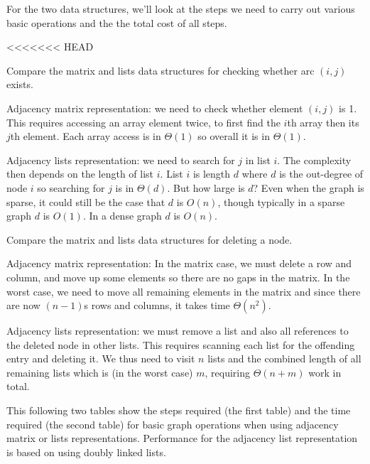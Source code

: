 For the two data structures, we'll look at the steps we need to carry out various basic operations and the the total cost of all steps. 

<<<<<<< HEAD
\begin{Boxample}[0]
Compare the matrix and lists data structures for checking whether arc $(i,j)$ exists.
 
Adjacency matrix representation: we need to check whether element $(i,j)$ is 1. This requires accessing
an array element twice, to first find the $i$th array then its $j$th element. Each array access is in $\Theta(1)$ so overall it is in $\Theta(1)$.

Adjacency lists representation: we need to search for $j$ in list $i$. The complexity then depends on the length of list $i$. 
List $i$ is length $d$ where $d$ is the out-degree of node $i$ so searching for $j$ is in $\Theta(d)$. 
But how large is $d$? Even when the graph is sparse, it could still be the case that $d$ is $O(n)$, though typically in a sparse graph $d$ is $O(1)$.  
In a dense graph $d$ is $O(n)$.
\end{Boxample}

\begin{Boxample}[0]
Compare the matrix and lists data structures for deleting a node.

Adjacency matrix representation: In the matrix case, we must delete a row and column, 
and move up some elements so there are no gaps in the matrix. 
In the worst case, we need to move all remaining elements in the matrix and since there are now $(n-1)$s rows and columns, it takes time $\Theta(n^2)$.

Adjacency lists representation: we must remove a list and also all references to the deleted node in other lists. 
This requires scanning each list for the offending entry and deleting it. 
We thus need to visit $n$ lists and the combined length of all remaining lists which is (in the worst case) $m$, requiring $\Theta(n+m)$ work in total.
\end{Boxample}

This following two tables  show the steps required (the first table) 
and the time required (the second table) for basic graph operations when using adjacency matrix or lists representations.  
Performance for the adjacency list representation is based on using doubly linked lists.

